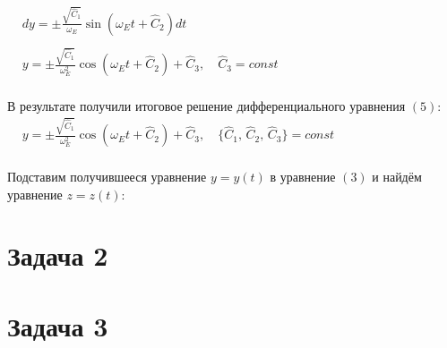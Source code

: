 \documentclass[oneside,final,14pt]{extarticle}
\begin{document}
		\begin{math}
			\begin{aligned}
				& dy = \pm \frac{\sqrt{\widehat{C}_1}}{\omega_{E}} \sin{(\omega_{E}t + \widehat{C}_{2})} dt \\\\
				& y = \pm \frac{\sqrt{\widehat{C}_1}}{\omega_{E}^{2}} \cos{(\omega_{E}t + \widehat{C}_{2})} + \widehat{C}_{3}, \quad \widehat{C}_{3} = const
			\end{aligned}
		\end{math} \\\\
		
		\noindent В результате получили итоговое решение дифференциального уравнения $(5)$: \\
		
		\begin{math}
			\begin{aligned}
				& y = \pm \frac{\sqrt{\widehat{C}_1}}{\omega_{E}^{2}} \cos{(\omega_{E}t + \widehat{C}_{2})} + \widehat{C}_{3}, \quad \{\widehat{C}_{1},\, \widehat{C}_{2},\, \widehat{C}_{3}\} = const
			\end{aligned}
		\end{math} \\\\
		
		\noindent Подставим получившееся уравнение $y = y(t)$ в уравнение $(3)$ и найдём уравнение $z = z(t)$:
		
	\newpage
	\section{Задача 2}
	
	\newpage
	
	\section{Задача 3}
	
	
\end{document}
